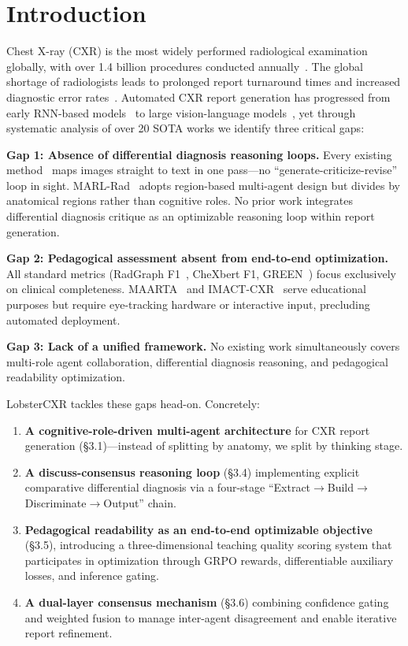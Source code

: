 \documentclass[runningheads,10pt]{llncs}
\begin{document}
\section{Introduction}

Chest X-ray (CXR) is the most widely performed radiological examination globally, with over 1.4 billion procedures conducted annually~\cite{chexagent}. The global shortage of radiologists leads to prolonged report turnaround times and increased diagnostic error rates~\cite{tanno2023}. Automated CXR report generation has progressed from early RNN-based models~\cite{r2gen} to large vision-language models~\cite{radialog,chexagent,cxrmate2}, yet through systematic analysis of over 20 SOTA works we identify three critical gaps:

\textbf{Gap 1: Absence of differential diagnosis reasoning loops.} Every existing method~\cite{r2gen,chexagent,riha,cxrmate2} maps images straight to text in one pass---no ``generate-criticize-revise'' loop in sight. MARL-Rad~\cite{marlrad} adopts region-based multi-agent design but divides by anatomical regions rather than cognitive roles. No prior work integrates differential diagnosis critique as an optimizable reasoning loop within report generation.

\textbf{Gap 2: Pedagogical assessment absent from end-to-end optimization.} All standard metrics (RadGraph F1~\cite{radgraph}, CheXbert F1, GREEN~\cite{green}) focus exclusively on clinical completeness. MAARTA~\cite{maarta} and IMACT-CXR~\cite{imactcxr} serve educational purposes but require eye-tracking hardware or interactive input, precluding automated deployment.

\textbf{Gap 3: Lack of a unified framework.} No existing work simultaneously covers multi-role agent collaboration, differential diagnosis reasoning, and pedagogical readability optimization.

LobsterCXR tackles these gaps head-on. Concretely:
\begin{enumerate}
    \item \textbf{A cognitive-role-driven multi-agent architecture} for CXR report generation (\S3.1)---instead of splitting by anatomy, we split by thinking stage.
    \item \textbf{A discuss-consensus reasoning loop} (\S3.4) implementing explicit comparative differential diagnosis via a four-stage ``Extract$\to$Build$\to$Discriminate$\to$Output'' chain.
    \item \textbf{Pedagogical readability as an end-to-end optimizable objective} (\S3.5), introducing a three-dimensional teaching quality scoring system that participates in optimization through GRPO rewards, differentiable auxiliary losses, and inference gating.
    \item \textbf{A dual-layer consensus mechanism} (\S3.6) combining confidence gating and weighted fusion to manage inter-agent disagreement and enable iterative report refinement.
\end{enumerate}
\end{document}
